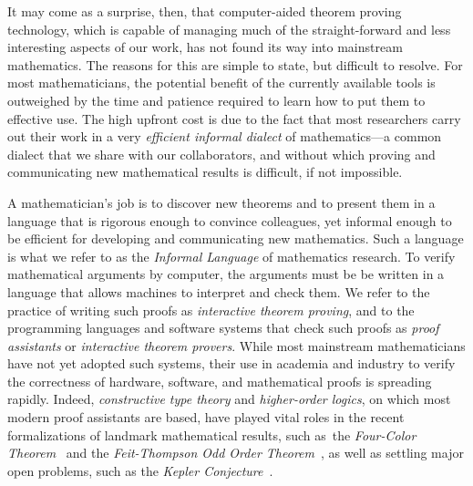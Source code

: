 \documentclass[11pt]{amsart}  %
\begin{document}
It may come as a surprise, then, that computer-aided theorem proving technology, which is capable of managing much of the straight-forward and less interesting aspects of our work, has not found its way into mainstream mathematics. The reasons for this are simple to state, but difficult to resolve. For most mathematicians, the potential benefit of the currently available tools is outweighed by the time and patience required to learn how to put them to effective use.  The high upfront cost is due to the fact that most researchers carry out their work in a very \emph{efficient informal dialect} of mathematics---a common dialect that we share with our collaborators, and without which proving and communicating new mathematical results is difficult, if not impossible.

A mathematician's job is to discover new theorems and to present them in a language that is rigorous enough to convince colleagues, yet informal enough to be efficient for developing and communicating new mathematics. Such a language is what we refer to as the \emph{Informal Language} of mathematics research. 
To verify mathematical arguments by computer, the arguments must be be written in a language that allows machines to interpret and check them. We refer to the practice of writing such proofs as \emph{interactive theorem proving}, and to the programming languages and software systems that check such proofs as \emph{proof assistants} or \emph{interactive theorem provers}.  While most mainstream mathematicians have not yet adopted such systems, their use in academia and industry to verify the correctness of hardware, software, and mathematical proofs is spreading rapidly. Indeed, \emph{constructive type theory} and \emph{higher-order logics}, on which most modern proof assistants are based, have played vital roles in the recent formalizations of landmark mathematical results, such as~the \emph{Four-Color Theorem}~\cite{MR2463991} and the \emph{Feit-Thompson Odd Order Theorem}~\cite{gonthier:2013b}, as well as settling major open problems, such as the \emph{Kepler Conjecture}~\cite{MR3659768}.
\end{document}
